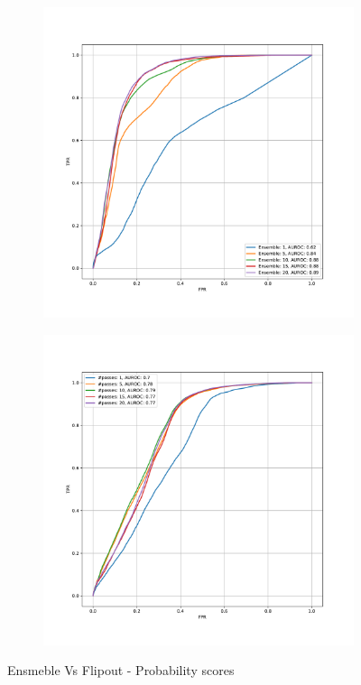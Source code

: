     \begin{figure}[h!]
        \begin{subfigure}{0.495\textwidth}
            \includegraphics[scale=0.35]{images/ensemble_probability_sem3dvs3dis_AUROC.pdf}
        \end{subfigure}
        \begin{subfigure}{0.495\textwidth}
            \includegraphics[scale=0.35]{images/flipout_probability_sem3dvs3dis_AUROC.pdf}
        \end{subfigure}
        \caption{Ensmeble Vs Flipout - Probability scores}
    \end{figure}

